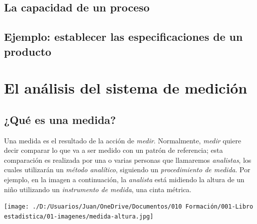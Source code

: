\documentclass[
  letterpaper,
]{scrbook}
\begin{document}
\hypertarget{la-capacidad-de-un-proceso}{%
\section{La capacidad de un proceso}\label{la-capacidad-de-un-proceso}}

\hypertarget{ejemplo-establecer-las-especificaciones-de-un-producto}{%
\section{Ejemplo: establecer las especificaciones de un
producto}\label{ejemplo-establecer-las-especificaciones-de-un-producto}}


\hypertarget{el-anuxe1lisis-del-sistema-de-mediciuxf3n}{%
\chapter{El análisis del sistema de
medición}\label{el-anuxe1lisis-del-sistema-de-mediciuxf3n}}

\hypertarget{quuxe9-es-una-medida}{%
\section{¿Qué es una medida?}\label{quuxe9-es-una-medida}}

Una medida es el resultado de la acción de \emph{medir}. Normalmente,
\emph{medir} quiere decir comparar lo que va a ser medido con un patrón
de referencia; esta comparación es realizada por una o varias personas
que llamaremos \emph{analistas}, los cuales utilizarán un \emph{método
analítico}, siguiendo un \emph{procedimiento de medida}. Por ejemplo, en
la imagen a continuación, la \emph{analista} está midiendo la altura de
un niño utilizando un \emph{instrumento de medida}, una cinta métrica.

\begin{marginfigure}

{\centering \texttt{[image: ./D:/Usuarios/Juan/OneDrive/Documentos/010 Formación/001-Libro estadistica/01-imagenes/medida-altura.jpg]}

}

\end{marginfigure}
\end{document}

